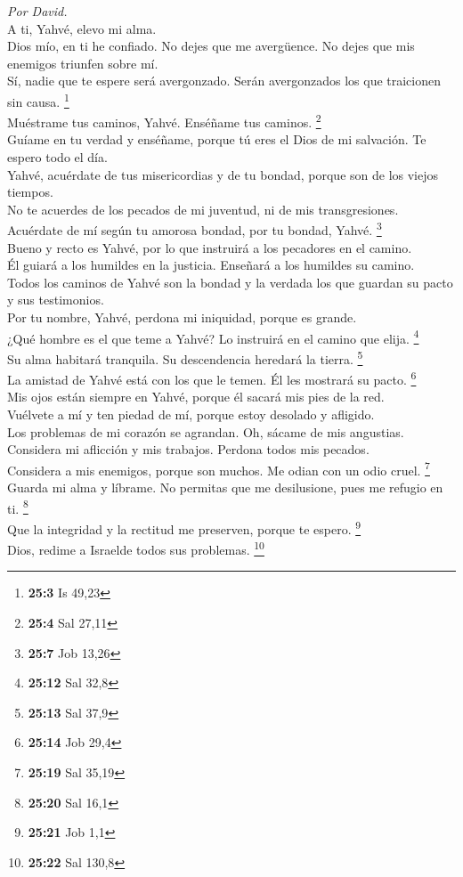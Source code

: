 \emph{Por David.}\\
 A ti, Yahvé, elevo mi alma.\\
 Dios mío, en ti he confiado. No dejes que me avergüence.
No dejes que mis enemigos triunfen sobre mí.\\
 Sí, nadie que te espere será avergonzado. Serán
avergonzados los que traicionen sin causa. \footnote{\textbf{25:3} Is
  49,23}\\
 Muéstrame tus caminos, Yahvé. Enséñame tus caminos.
\footnote{\textbf{25:4} Sal 27,11}\\
 Guíame en tu verdad y enséñame, porque tú eres el Dios de
mi salvación. Te espero todo el día.\\
 Yahvé, acuérdate de tus misericordias y de tu bondad,
porque son de los viejos tiempos.\\
 No te acuerdes de los pecados de mi juventud, ni de mis
transgresiones. Acuérdate de mí según tu amorosa bondad, por tu bondad,
Yahvé. \footnote{\textbf{25:7} Job 13,26}\\
 Bueno y recto es Yahvé, por lo que instruirá a los
pecadores en el camino.\\
 Él guiará a los humildes en la justicia. Enseñará a los
humildes su camino.\\
 Todos los caminos de Yahvé son la bondad y la verdada
los que guardan su pacto y sus testimonios.\\
 Por tu nombre, Yahvé, perdona mi iniquidad, porque es
grande.\\
 ¿Qué hombre es el que teme a Yahvé? Lo instruirá en el
camino que elija. \footnote{\textbf{25:12} Sal 32,8}\\
 Su alma habitará tranquila. Su descendencia heredará la
tierra. \footnote{\textbf{25:13} Sal 37,9}\\
 La amistad de Yahvé está con los que le temen. Él les
mostrará su pacto. \footnote{\textbf{25:14} Job 29,4}\\
 Mis ojos están siempre en Yahvé, porque él sacará mis
pies de la red.\\
 Vuélvete a mí y ten piedad de mí, porque estoy desolado
y afligido.\\
 Los problemas de mi corazón se agrandan. Oh, sácame de
mis angustias.\\
 Considera mi aflicción y mis trabajos. Perdona todos mis
pecados.\\
 Considera a mis enemigos, porque son muchos. Me odian
con un odio cruel. \footnote{\textbf{25:19} Sal 35,19}\\
 Guarda mi alma y líbrame. No permitas que me
desilusione, pues me refugio en ti. \footnote{\textbf{25:20} Sal 16,1}\\
 Que la integridad y la rectitud me preserven, porque te
espero. \footnote{\textbf{25:21} Job 1,1}\\
 Dios, redime a Israelde todos sus problemas. \footnote{\textbf{25:22}
  Sal 130,8}

